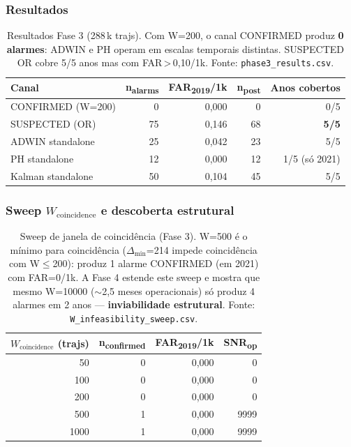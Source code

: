 \documentclass[11pt,a4paper]{article}
\begin{document}
\subsubsection{Resultados}

\begin{table}[H]
\centering\small
\begin{tabular}{l r r r r}
\toprule
\textbf{Canal} & \textbf{n\textsubscript{alarms}} & \textbf{FAR\textsubscript{2019}/1k} & \textbf{n\textsubscript{post}} & \textbf{Anos cobertos} \\
\midrule
CONFIRMED (W=200)  & 0 & 0{,}000 & 0 & 0/5 \\
SUSPECTED (OR)     & 75 & 0{,}146 & 68 & \textbf{5/5} \\
ADWIN standalone   & 25 & 0{,}042 & 23 & 5/5 \\
PH standalone      & 12 & 0{,}000 & 12 & 1/5 (s\'o 2021) \\
Kalman standalone  & 50 & 0{,}104 & 45 & 5/5 \\
\bottomrule
\end{tabular}
\caption{Resultados Fase 3 (288\,k trajs). Com W=200, o canal
         CONFIRMED produz \textbf{0 alarmes}: ADWIN e PH operam em
         escalas temporais distintas. SUSPECTED OR cobre 5/5 anos mas
         com FAR\,>\,0{,}10/1k. Fonte: \texttt{phase3\_results.csv}.}
\label{tab:m9_p3_results}
\end{table}

\subsubsection{Sweep $W_\text{coincidence}$ e descoberta estrutural}

\begin{table}[H]
\centering\small
\begin{tabular}{r r r r}
\toprule
\textbf{$W_\text{coincidence}$ (trajs)} & \textbf{n\textsubscript{confirmed}} & \textbf{FAR\textsubscript{2019}/1k} & \textbf{SNR\textsubscript{op}} \\
\midrule
50    & 0 & 0{,}000 & 0 \\
100   & 0 & 0{,}000 & 0 \\
200   & 0 & 0{,}000 & 0 \\
500   & 1 & 0{,}000 & 9999 \\
1000  & 1 & 0{,}000 & 9999 \\
\bottomrule
\end{tabular}
\caption{Sweep de janela de coincid\^encia (Fase 3). W=500 \'e o m\'inimo
         para coincid\^encia ($\Delta_{\min}$=214 impede coincid\^encia com
         W$\leq$200): produz 1 alarme CONFIRMED (em 2021) com
         FAR=0/1k. A Fase 4 estende este sweep e mostra que mesmo W=10000
         ($\sim$2{,}5 meses operacionais) s\'o produz 4 alarmes em 2 anos ---
         \textbf{inviabilidade estrutural}. Fonte:
         \texttt{W\_infeasibility\_sweep.csv}.}
\label{tab:m9_p3_sweep}
\end{table}
\end{document}

